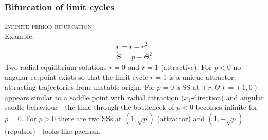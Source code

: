 \subsubsection{Bifurcation of limit cycles}
\textsc{Infinite period bifurcation}\\
Example:
\begin{align*}
\dot{r}=r-r^2\\
\dot{\Theta}=p-\Theta^2
\end{align*}
Two radial equilibrium solutions $r=0$ and $r=1$ (attractive). For $p<0$ no angular eq.point exists so that the limit cycle $r=1$ is a unique attractor, attracting trajectories from unstable origin. For $p=0$ a SS at $(r,\Theta)=(1,0)$ appears similar to a saddle point with radial attraction ($x_1$-direction) and angular saddle behaviour - the time through the bottleneck of $p<0$ becomes infinite for $p=0$. For $p>0$ there are two SSs at $(1,\sqrt{p})$ (attractor) and $(1,-\sqrt{p})$ (repulsor) - looks like pacman.
\begin{center}
\end{center}

